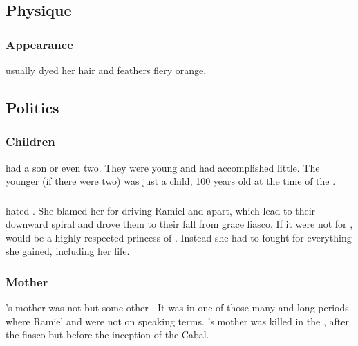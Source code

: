 \subsection{Physique}




\subsubsection{Appearance}
\Cishiel usually dyed her hair and feathers fiery orange. 









\subsection{Politics}





\subsubsection{Children}
\Cishiel had a son or even two.
They were young and had accomplished little.
The younger (if there were two) was just a child, 100 years old at the time of the \firstbanewar.





\subsubsection{\Eryal}
\Cishiel{} hated \Eryal. 
She blamed her for driving Ramiel and \Shiaraid{} apart, which lead to their downward spiral and drove them to their fall from grace \malach{} fiasco. 
If it were not for \Eryal, \Cishiel{} would be a highly respected princess of \Mystraacht. 
Instead she had to fought for everything she gained, including her life.





\subsubsection{Mother}
\Cishiel's mother was not \Shiaraid but some other \resvil.
It was in one of those many and long periods where Ramiel and \Shiaraid were not on speaking terms.
\Cishiel's mother was killed in the \resphanwars, after the \malach fiasco but before the inception of the Cabal.





